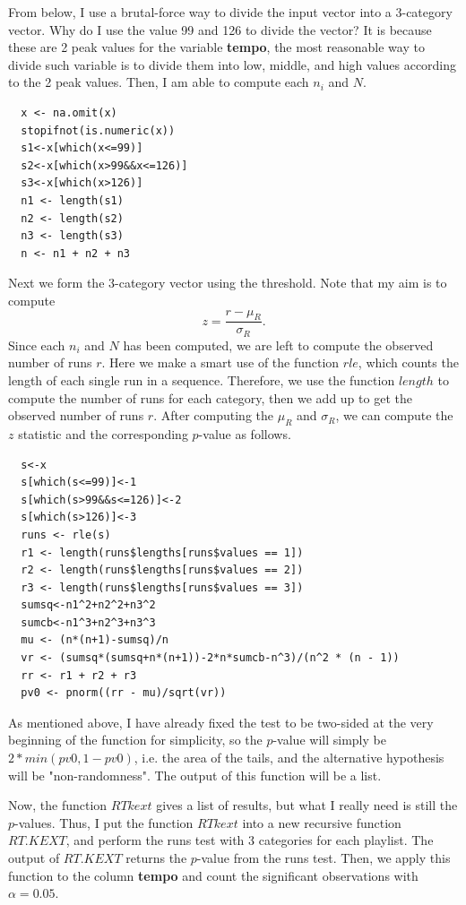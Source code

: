 \documentclass[12pt]{article}
\theoremstyle{plain}
\theoremstyle{definition}
\theoremstyle{remark}
\begin{document}
From below, I use a brutal-force way to divide the input vector into a 3-category vector. Why do I use the value 99 and 126 to divide the vector? It is because these are 2 peak values for the variable \textbf{tempo}, the most reasonable way to divide such variable is to divide them into low, middle, and high values according to the 2 peak values. Then, I am able to compute each $n_i$ and $N$. 
\begin{verbatim}
  x <- na.omit(x)
  stopifnot(is.numeric(x))
  s1<-x[which(x<=99)]
  s2<-x[which(x>99&&x<=126)]
  s3<-x[which(x>126)]
  n1 <- length(s1)
  n2 <- length(s2)
  n3 <- length(s3)
  n <- n1 + n2 + n3
\end{verbatim}
Next we form the 3-category vector using the threshold. Note that my aim is to compute $$z=\frac{r-\mu_R}{\sigma_R}.$$ Since each $n_i$ and $N$ has been computed, we are left to compute the observed number of runs $r$. Here we make a smart use of the function $rle$, which counts the length of each single run in a sequence. Therefore, we use the function $length$ to compute the number of runs for each category, then we add up to get the observed number of runs $r$. After computing the $\mu_R$ and $\sigma_R$, we can compute the $z$ statistic and the corresponding $p$-value as follows.
\begin{verbatim}
  s<-x
  s[which(s<=99)]<-1
  s[which(s>99&&s<=126)]<-2
  s[which(s>126)]<-3
  runs <- rle(s)
  r1 <- length(runs$lengths[runs$values == 1])
  r2 <- length(runs$lengths[runs$values == 2])
  r3 <- length(runs$lengths[runs$values == 3])
  sumsq<-n1^2+n2^2+n3^2
  sumcb<-n1^3+n2^3+n3^3
  mu <- (n*(n+1)-sumsq)/n
  vr <- (sumsq*(sumsq+n*(n+1))-2*n*sumcb-n^3)/(n^2 * (n - 1))
  rr <- r1 + r2 + r3
  pv0 <- pnorm((rr - mu)/sqrt(vr))
\end{verbatim}  
As mentioned above, I have already fixed the test to be two-sided at the very beginning of the function for simplicity, so the $p$-value will simply be $2 * min(pv0, 1 - pv0)$, i.e. the area of the tails, and the alternative hypothesis will be "non-randomness". The output of this function will be a list.

Now, the function $RTkext$ gives a list of results, but what I really need is still the $p$-values. Thus, I put the function $RTkext$ into a new recursive function $RT.KEXT$, and perform the runs test with 3 categories for each playlist. The output of $RT.KEXT$ returns the $p$-value from the runs test. Then, we apply this function to the column \textbf{tempo} and count the significant observations with $\alpha=0.05$. 
\end{document}
